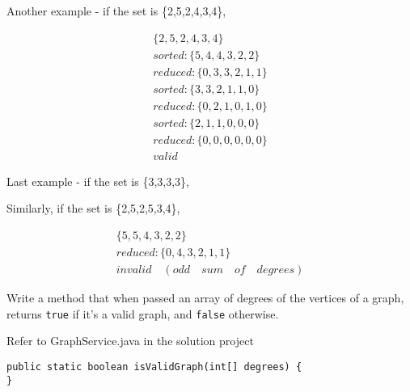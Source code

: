 \begin{questions}
Another example - if the set is \{2,5,2,4,3,4\},

\begin{align*}
\{2,5,2,4,3,4\}\\
sorted: \{5,4,4,3,2,2\}\\
reduced: \{0,3,3,2,1,1\}\\
sorted: \{3,3,2,1,1,0\}\\
reduced: \{0,2,1,0,1,0\}\\
sorted: \{2,1,1,0,0,0\}\\
reduced: \{0,0,0,0,0,0\}\\
valid
\end{align*}

Last example - if the set is \{3,3,3,3\},

Similarly, if the set is \{2,5,2,5,3,4\},

\begin{align*}
\{5,5,4,3,2,2\}\\
reduced: \{0,4,3,2,1,1\}\\
invalid \quad (odd \quad sum \quad of \quad degrees)
\end{align*}

Write a method that when passed an array of degrees of the vertices of a graph, returns \texttt{true} if it's a valid graph, and \texttt{false} otherwise.

\ifprintanswers
Refer to GraphService.java in the solution project	
\else
\begin{solution}
\begin{lstlisting}
public static boolean isValidGraph(int[] degrees) {
}	
\end{lstlisting}
\end{solution}
\fi

\end{questions}

